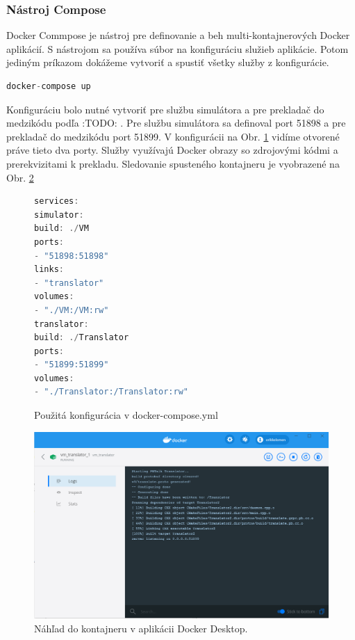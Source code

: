 \subsubsection{Nástroj Compose}

Docker Commpose je nástroj pre definovanie a beh multi-kontajnerových Docker aplikácií. S nástrojom sa používa súbor na konfiguráciu služieb aplikácie. Potom jediným príkazom dokážeme vytvoriť a spustiť všetky služby z konfigurácie. \cite{docker_docs}

\begin{lstlisting}[language=C++]
docker-compose up
\end{lstlisting}

Konfiguráciu bolo nutné vytvoriť pre službu simulátora a pre prekladač do medzikódu podľa :TODO: . Pre službu simulátora sa definoval port 51898 a pre prekladač do medzikódu port 51899. V konfigurácii na Obr. \ref{fig:docker-compose} vidíme otvorené práve tieto dva porty. Služby využívajú Docker obrazy so zdrojovými kódmi a prerekvizitami k prekladu. Sledovanie spusteného kontajneru je vyobrazené na Obr. \ref{fig:docker-desktop1}

\begin{figure}[H]
	\centering
\begin{lstlisting}[language=C++]
services:
simulator:
build: ./VM
ports:
- "51898:51898"
links: 
- "translator"
volumes: 
- "./VM:/VM:rw"
translator:
build: ./Translator
ports:
- "51899:51899"
volumes:
- "./Translator:/Translator:rw"
\end{lstlisting}
\caption{Použitá konfigurácia v docker-compose.yml}
\label{fig:docker-compose}
\end{figure}

\begin{figure}[H]
	\centering
	\includegraphics[scale=0.5]{obrazky-figures/PC-docker-desktop1}
	\caption{Náhľad do kontajneru v aplikácii Docker Desktop.}
	\label{fig:docker-desktop1}
\end{figure}




